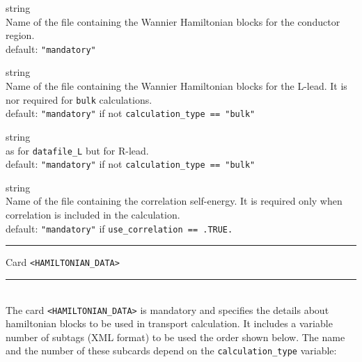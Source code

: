 {\noindent{}%
{\sc string} \\ Name of the file containing the Wannier Hamiltonian blocks for the
            conductor region. \\
            {\sc default}: {\tt "mandatory"} \par

\noindent{}%
{\sc string} \\ Name of the file containing the Wannier Hamiltonian blocks for the
            L-lead. It is nor required for {\tt bulk} calculations. \\
            {\sc default}: {\tt "mandatory"} if not {\tt calculation\_type == "bulk"} \par

\noindent{}%
{\sc string} \\ as for {\tt datafile\_L} but for R-lead. \\
            {\sc default}: {\tt "mandatory"} if not {\tt calculation\_type == "bulk"} \par

\noindent{}%
{\sc string} \\ Name of the file containing the correlation self-energy. It is required only
            when correlation is included in the calculation. \\
            {\sc default}: {\tt "mandatory"} if {\tt use\_correlation == .TRUE.} \par
}
\bigskip

\begin{centering}
\rule{2.0in}{0.01in} Card {\tt <HAMILTONIAN\_DATA>} \rule{2.0in}{0.01in}
\end{centering}\\

\noindent The card {\tt <HAMILTONIAN\_DATA>} is mandatory and specifies
the details about hamiltonian blocks to be used in transport calculation.
It includes a variable number of subtags (XML format)
to be used the order shown below. The name and the number of these subcards
depend on the {\tt calculation\_type} variable:

